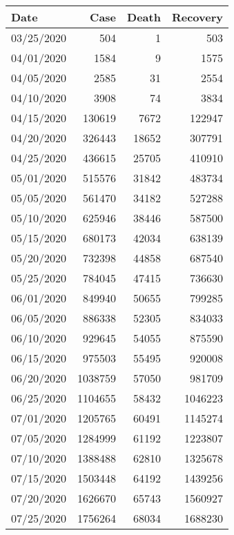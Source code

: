\begin{table}[h]
        \centering
        \begin{tabular}{lrrr}
        \toprule
        Date		    &		Case		&		Death		&		Recovery \\\midrule
        03/25/2020		&		504         &		1		    &		503     \\
        04/01/2020		&		1584		&		9		    &		1575    \\
        04/05/2020		&		2585		&		31		    &		2554    \\
        04/10/2020		&		3908		&		74		    &		3834    \\
        04/15/2020		&		130619		&		7672		&		122947 \\
        04/20/2020		&		326443		&		18652		&		307791 \\
        04/25/2020		&		436615		&		25705		&		410910 \\
        05/01/2020		&		515576		&		31842		&		483734 \\
        05/05/2020		&		561470		&		34182		&		527288 \\
        05/10/2020		&		625946		&		38446		&		587500 \\
        05/15/2020		&		680173		&		42034		&		638139 \\
        05/20/2020		&		732398		&		44858		&		687540 \\
        05/25/2020		&		784045		&		47415		&		736630 \\
        06/01/2020		&		849940		&		50655		&		799285 \\
        06/05/2020		&		886338		&		52305		&		834033 \\
        06/10/2020		&		929645		&		54055		&		875590 \\
        06/15/2020		&		975503		&		55495		&		920008 \\
        06/20/2020		&		1038759		&		57050		&		981709 \\
        06/25/2020		&		1104655		&		58432		&		1046223 \\
        07/01/2020		&		1205765		&		60491		&		1145274 \\
        07/05/2020		&		1284999		&		61192		&		1223807 \\
        07/10/2020		&		1388488		&		62810		&		1325678 \\
        07/15/2020		&		1503448		&		64192		&		1439256 \\
        07/20/2020		&		1626670		&		65743		&		1560927 \\
        07/25/2020		&		1756264		&		68034		&		1688230 \\

\end{tabular}
\end{table}

